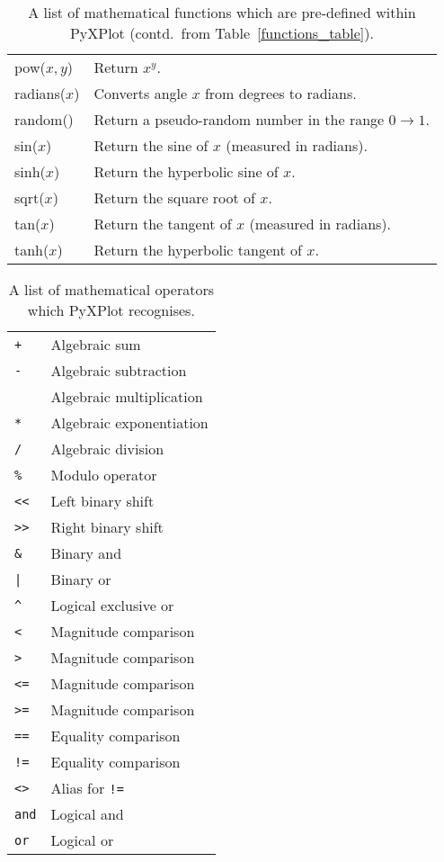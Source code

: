 \begin{table}
\begin{longtable}{|lp{8cm}|}
\hline
pow($x,y$)&
Return $x^y$.\\
radians($x$)&
Converts angle $x$ from degrees to radians.\\
random()&
Return a pseudo-random number in the range $0\to1$.\\
sin($x$)&
Return the sine of $x$ (measured in radians).\\
sinh($x$)&
Return the hyperbolic sine of $x$.\\
sqrt($x$)&
Return the square root of $x$.\\
tan($x$)&
Return the tangent of $x$ (measured in radians).\\
tanh($x$)&
Return the hyperbolic tangent of $x$.\\
\hline
\end{longtable}
\caption{A list of mathematical functions which are pre-defined within PyXPlot (contd.\ from Table~\ref{functions_table}).}
\label{functions_table2}
\end{table}

\begin{table}
\begin{longtable}{|lp{8cm}|}
\hline
{\tt +} & Algebraic sum \\
{\tt -} & Algebraic subtraction \\
{\tt *} & Algebraic multiplication \\
{\tt **} & Algebraic exponentiation \\
{\tt /} & Algebraic division \\
{\tt \%} & Modulo operator \\
{\tt <<} & Left binary shift \\
{\tt >>} & Right binary shift \\
{\tt \&} & Binary and \\
{\tt |} & Binary or \\
{\tt \^{}} & Logical exclusive or \\
{\tt <} & Magnitude comparison \\
{\tt >} & Magnitude comparison \\
{\tt <=} & Magnitude comparison \\
{\tt >=} & Magnitude comparison \\
{\tt ==} & Equality comparison \\
{\tt !=} & Equality comparison \\
{\tt <>} & Alias for {\tt !=} \\
{\tt and} & Logical and \\
{\tt or} & Logical or \\
\hline
\end{longtable}
\caption{A list of mathematical operators which PyXPlot recognises.}
\label{operators_table}
\end{table}

